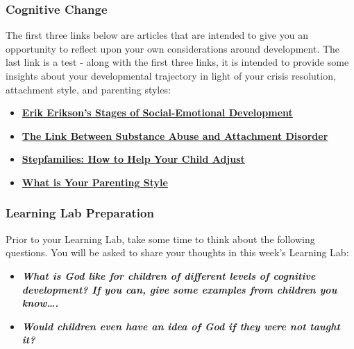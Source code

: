 \documentclass[
]{book}
\providecommand{\tightlist}{%
  \setlength{\itemsep}{0pt}\setlength{\parskip}{0pt}}
\begin{document}
\begin{reflect}
\hypertarget{cognitive-change}{%
\subsubsection*{Cognitive Change}\label{cognitive-change}}

The first three links below are articles that are intended to give you an opportunity to reflect upon your own considerations around development. The last link is a test - along with the first three links, it is intended to provide some insights about your developmental trajectory in light of your crisis resolution, attachment style, and parenting styles:

\begin{itemize}
\tightlist
\item
  \href{http://www.childdevelopmentinfo.com/development/erickson.shtml}{\textbf{Erik Erikson's Stages of Social-Emotional Development}}\\
\item
  \href{http://www.attachmentdisorder.net/}{\textbf{The Link Between Substance Abuse and Attachment Disorder}}\\
\item
  \href{https://www.mayoclinic.org/healthy-lifestyle/childrens-health/in-depth/stepfamilies/art-20047046}{\textbf{Stepfamilies: How to Help Your Child Adjust}}\\
\item
  \href{https://www.3smartcubes.com/pages/tests/parentingstyle/parentingstyle_instructions/}{\textbf{What is Your Parenting Style}}
\end{itemize}

\hypertarget{learning-lab-preparation-1}{%
\subsubsection*{Learning Lab Preparation}\label{learning-lab-preparation-1}}

Prior to your Learning Lab, take some time to think about the following questions. You will be asked to share your thoughts in this week's Learning Lab:

\begin{itemize}
\tightlist
\item
  \textbf{\emph{What is God like for children of different levels of cognitive development? If you can, give some examples from children you know\ldots.}}
\item
  \textbf{\emph{Would children even have an idea of God if they were not taught it?}}
\end{itemize}
\end{reflect}
\end{document}
